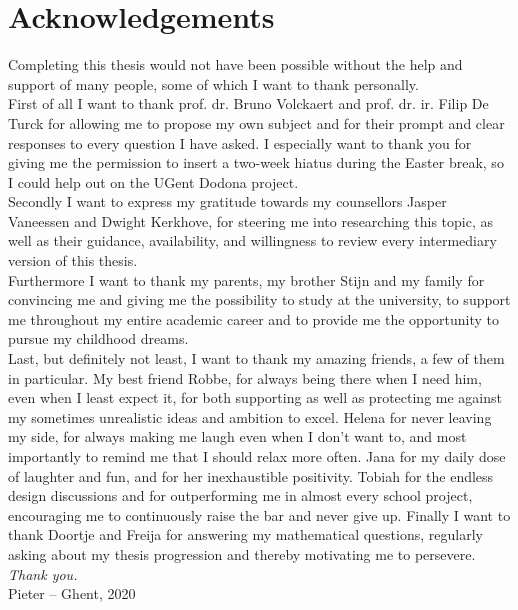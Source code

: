
\chapter*{Acknowledgements}

Completing this thesis would not have been possible without the help and support of many people, some of which I want to thank personally.\\

\noindent First of all I want to thank prof. dr. Bruno Volckaert and prof. dr. ir. Filip De Turck for allowing me to propose my own subject and for their prompt and clear responses to every question I have asked. I especially want to thank you for giving me the permission to insert a two-week hiatus during the Easter break, so I could help out on the UGent Dodona project.\\

\noindent Secondly I want to express my gratitude towards my counsellors Jasper Vaneessen and Dwight Kerkhove, for steering me into researching this topic, as well as their guidance, availability, and willingness to review every intermediary version of this thesis.\\

\noindent Furthermore I want to thank my parents, my brother Stijn and my family for convincing me and giving me the possibility to study at the university, to support me throughout my entire academic career and to provide me the opportunity to pursue my childhood dreams.\\

\noindent Last, but definitely not least, I want to thank my amazing friends, a few of them in particular. My best friend Robbe, for always being there when I need him, even when I least expect it, for both supporting as well as protecting me against my sometimes unrealistic ideas and ambition to excel. Helena for never leaving my side, for always making me laugh even when I don't want to, and most importantly to remind me that I should relax more often. Jana for my daily dose of laughter and fun, and for her inexhaustible positivity. Tobiah for the endless design discussions and for outperforming me in almost every school project, encouraging me to continuously raise the bar and never give up. Finally I want to thank Doortje and Freija for answering my mathematical questions, regularly asking about my thesis progression and thereby motivating me to persevere.\\

\noindent \emph{Thank you.}\\

\noindent Pieter -- Ghent, 2020